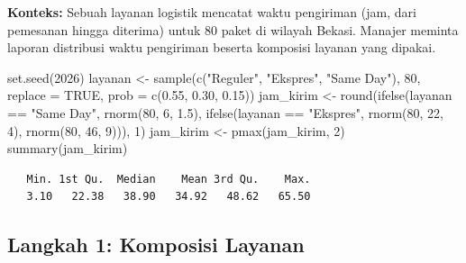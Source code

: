 \documentclass[
  indonesian,
  letterpaper,
]{book}
\newenvironment{Shaded}{\begin{snugshade}}{\end{snugshade}}
\newcommand{\AttributeTok}[1]{\textcolor[rgb]{0.40,0.45,0.13}{#1}}
\newcommand{\ConstantTok}[1]{\textcolor[rgb]{0.56,0.35,0.01}{#1}}
\newcommand{\DecValTok}[1]{\textcolor[rgb]{0.68,0.00,0.00}{#1}}
\newcommand{\FloatTok}[1]{\textcolor[rgb]{0.68,0.00,0.00}{#1}}
\newcommand{\FunctionTok}[1]{\textcolor[rgb]{0.28,0.35,0.67}{#1}}
\newcommand{\NormalTok}[1]{\textcolor[rgb]{0.00,0.23,0.31}{#1}}
\newcommand{\OtherTok}[1]{\textcolor[rgb]{0.00,0.23,0.31}{#1}}
\newcommand{\SpecialCharTok}[1]{\textcolor[rgb]{0.37,0.37,0.37}{#1}}
\newcommand{\StringTok}[1]{\textcolor[rgb]{0.13,0.47,0.30}{#1}}
\begin{document}
\textbf{Konteks:} Sebuah layanan logistik mencatat waktu pengiriman
(jam, dari pemesanan hingga diterima) untuk 80 paket di wilayah Bekasi.
Manajer meminta laporan distribusi waktu pengiriman beserta komposisi
layanan yang dipakai.

\begin{Shaded}
\begin{Highlighting}[]
\FunctionTok{set.seed}\NormalTok{(}\DecValTok{2026}\NormalTok{)}
\NormalTok{layanan }\OtherTok{\textless{}{-}} \FunctionTok{sample}\NormalTok{(}\FunctionTok{c}\NormalTok{(}\StringTok{"Reguler"}\NormalTok{, }\StringTok{"Ekspres"}\NormalTok{, }\StringTok{"Same Day"}\NormalTok{), }\DecValTok{80}\NormalTok{, }\AttributeTok{replace =} \ConstantTok{TRUE}\NormalTok{, }\AttributeTok{prob =} \FunctionTok{c}\NormalTok{(}\FloatTok{0.55}\NormalTok{, }\FloatTok{0.30}\NormalTok{, }\FloatTok{0.15}\NormalTok{))}
\NormalTok{jam\_kirim }\OtherTok{\textless{}{-}} \FunctionTok{round}\NormalTok{(}\FunctionTok{ifelse}\NormalTok{(layanan }\SpecialCharTok{==} \StringTok{"Same Day"}\NormalTok{, }\FunctionTok{rnorm}\NormalTok{(}\DecValTok{80}\NormalTok{, }\DecValTok{6}\NormalTok{, }\FloatTok{1.5}\NormalTok{),}
\FunctionTok{ifelse}\NormalTok{(layanan }\SpecialCharTok{==} \StringTok{"Ekspres"}\NormalTok{, }\FunctionTok{rnorm}\NormalTok{(}\DecValTok{80}\NormalTok{, }\DecValTok{22}\NormalTok{, }\DecValTok{4}\NormalTok{), }\FunctionTok{rnorm}\NormalTok{(}\DecValTok{80}\NormalTok{, }\DecValTok{46}\NormalTok{, }\DecValTok{9}\NormalTok{))), }\DecValTok{1}\NormalTok{)}
\NormalTok{jam\_kirim }\OtherTok{\textless{}{-}} \FunctionTok{pmax}\NormalTok{(jam\_kirim, }\DecValTok{2}\NormalTok{)}
\FunctionTok{summary}\NormalTok{(jam\_kirim)}
\end{Highlighting}
\end{Shaded}

\begin{verbatim}
   Min. 1st Qu.  Median    Mean 3rd Qu.    Max. 
   3.10   22.38   38.90   34.92   48.62   65.50 
\end{verbatim}

\subsection{Langkah 1: Komposisi
Layanan}\label{langkah-1-komposisi-layanan}
\end{document}
